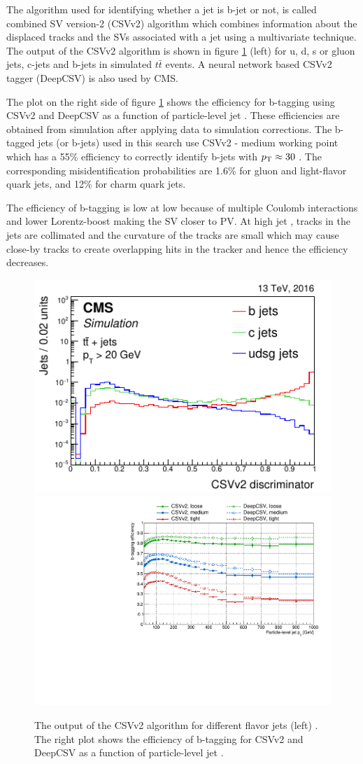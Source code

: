 The algorithm used for identifying whether a jet is b-jet or not, is called combined SV version-2 (CSVv2) algorithm \cite{BTV-16-002} 
which combines information about the displaced tracks and the SVs associated with a jet using a multivariate technique. The output of the 
CSVv2 algorithm is shown in figure \ref{fig:bTagCSVv2op} (left) for u, d, s or gluon jets, c-jets and b-jets in simulated $t\bar{t}$ 
events. A neural network based CSVv2 tagger (DeepCSV) is also used by CMS. 

The plot on the right side of figure \ref{fig:bTagCSVv2op} shows the efficiency for b-tagging using CSVv2 and DeepCSV as a function of 
particle-level jet \pt. These efficiencies are obtained from simulation after applying data to simulation corrections. The b-tagged jets 
(or b-jets) used in this search use CSVv2 - medium working point which has a 55\% efficiency to correctly identify b-jets with $p_{\mathrm{T}} 
\approx 30$ \gev. The corresponding misidentification probabilities are 1.6\% for gluon and light-flavor quark jets, and 12\% for charm 
quark jets. 

The efficiency of b-tagging is low at low \pt because of multiple Coulomb interactions and lower Lorentz-boost making the SV closer to PV. 
At high jet \pt, tracks in the jets are collimated and the curvature of the tracks are small which may cause close-by tracks to create 
overlapping hits in the tracker and hence the efficiency decreases.
\begin{figure}[h!]
\centering
\includegraphics[width=0.44\linewidth]{../Figures/Chap2/bTagCSVv2op}
\includegraphics[width=0.52\linewidth]{../Figures/Chap2/btag_eff_CSVv2_DeepCSV}
\captionsetup{width=.98\linewidth}
\caption[CSVv2 output and b-tagging efficiency]{The output of the CSVv2 algorithm for different flavor jets (left) \cite{BTV-16-002}. The right plot shows the efficiency of b-tagging for CSVv2 and DeepCSV as a function of particle-level jet \pt \cite{btagEffTwiki}.}
\label{fig:bTagCSVv2op}
\end{figure}
